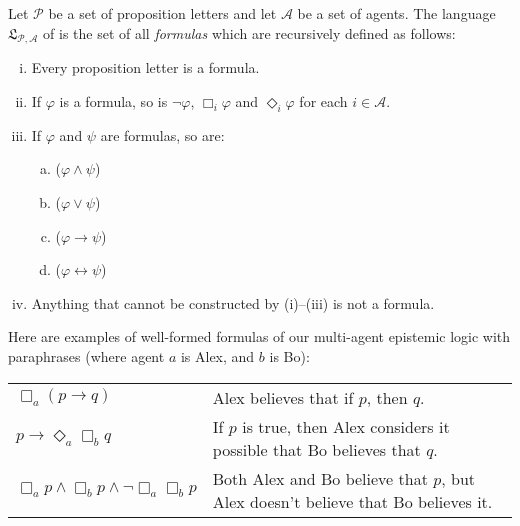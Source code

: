 \documentclass[nobib,nofonts]{tufte-handout}
\newcommand{\modlog}{\acro{ModLog}}
\begin{document}
Let $\mathcal{P}$ be a set of proposition letters and let $\mathcal{A}$ be a set of agents.
The language $\mathfrak{L}_{\mathcal{P},\mathcal{A}}$ of \modlog is the set of all \emph{formulas} which are recursively defined as follows:
\begin{enumerate}[(i)]
  \item Every proposition letter is a formula.
  \item If $\varphi$ is a formula, so is $\neg \varphi$, $\Box_{i} \varphi$ and $\Diamond_{i} \varphi$ for each $i \in \mathcal{A}$.
  \item If $\varphi$ and $\psi$ are formulas, so are:
        \vspace*{-0.4cm}
        \begin{multicols}{4}
          \begin{enumerate}[a.]
            \item ($\varphi \wedge \psi$)
            \item ($\varphi \vee \psi$)
            \item ($\varphi \rightarrow \psi$)
            \item ($\varphi \leftrightarrow \psi$)
          \end{enumerate}
        \end{multicols}
        \vspace*{-0.4cm}
  \item Anything that cannot be constructed by (i)--(iii) is not a formula.
\end{enumerate}


Here are examples of well-formed formulas of our multi-agent epistemic logic with paraphrases (where agent $a$ is Alex, and $b$ is Bo):
\begin{center}
  \begin{tabular}{lp{7cm}}
    \vspace{0.3cm}
    $\Box_{a} (p \rightarrow q)$
    & Alex believes that if $p$, then $q$.
    \\
    \vspace{0.3cm}
    $p \rightarrow \Diamond_{a} \Box_{b} q$
    & If $p$ is true, then Alex considers it possible that Bo believes that $q$.
    \\
    $\Box_{a} p \wedge \Box_{b} p \wedge \neg \Box_{a} \Box_{b} p$
    & Both Alex and Bo believe that $p$, but Alex doesn't believe that Bo believes it.

  \end{tabular}
\end{center}
\end{document}
